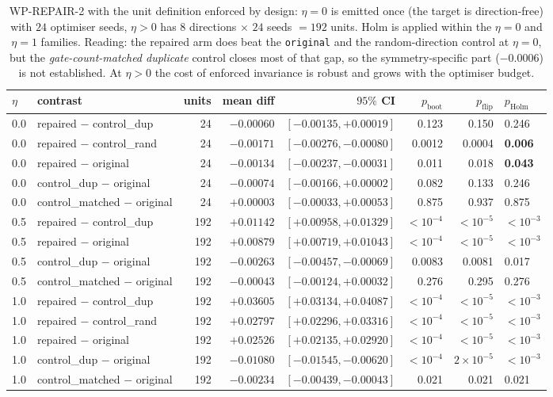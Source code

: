 \documentclass{neurips_2024}
\begin{document}
\begin{table}[t]
\centering
\caption{WP-REPAIR-2 with the unit definition enforced by design: $\eta{=}0$ is emitted
once (the target is direction-free) with $24$ optimiser seeds, $\eta{>}0$ has
$8$ directions $\times$ $24$ seeds $=192$ units. Holm is applied within the
$\eta{=}0$ and $\eta{=}1$ families. Reading: the repaired arm does beat the
\texttt{original} and the random-direction control at $\eta{=}0$, but the
\emph{gate-count-matched duplicate} control closes most of that gap, so the
symmetry-specific part ($-0.0006$) is not established. At $\eta{>}0$ the cost of enforced
invariance is robust and grows with the optimiser budget.}
\label{tab:rep2}
\small
\begin{tabular}{@{}llrrrrrl@{}}
\toprule
$\eta$ & contrast & units & mean diff & $95\%$ CI & $p_{\text{boot}}$ & $p_{\text{flip}}$ & $p_{\text{Holm}}$ \\
\midrule
0.0 & repaired $-$ control\_dup & 24 & $-0.00060$ & $[-0.00135,+0.00019]$ & 0.123 & 0.150 & 0.246 \\
0.0 & repaired $-$ control\_rand & 24 & $\mathbf{-0.00171}$ & $[-0.00276,-0.00080]$ & 0.0012 & 0.0004 & \textbf{0.006} \\
0.0 & repaired $-$ original & 24 & $\mathbf{-0.00134}$ & $[-0.00237,-0.00031]$ & 0.011 & 0.018 & \textbf{0.043} \\
0.0 & control\_dup $-$ original & 24 & $-0.00074$ & $[-0.00166,+0.00002]$ & 0.082 & 0.133 & 0.246 \\
0.0 & control\_matched $-$ original & 24 & $+0.00003$ & $[-0.00033,+0.00053]$ & 0.875 & 0.937 & 0.875 \\
\midrule
0.5 & repaired $-$ control\_dup & 192 & $+0.01142$ & $[+0.00958,+0.01329]$ & $<10^{-4}$ & $<10^{-5}$ & $<10^{-3}$ \\
0.5 & repaired $-$ original & 192 & $+0.00879$ & $[+0.00719,+0.01043]$ & $<10^{-4}$ & $<10^{-5}$ & $<10^{-3}$ \\
0.5 & control\_dup $-$ original & 192 & $-0.00263$ & $[-0.00457,-0.00069]$ & 0.0083 & 0.0081 & 0.017 \\
0.5 & control\_matched $-$ original & 192 & $-0.00043$ & $[-0.00124,+0.00032]$ & 0.276 & 0.295 & 0.276 \\
\midrule
1.0 & repaired $-$ control\_dup & 192 & $\mathbf{+0.03605}$ & $[+0.03134,+0.04087]$ & $<10^{-4}$ & $<10^{-5}$ & $<10^{-3}$ \\
1.0 & repaired $-$ control\_rand & 192 & $+0.02797$ & $[+0.02296,+0.03316]$ & $<10^{-4}$ & $<10^{-5}$ & $<10^{-3}$ \\
1.0 & repaired $-$ original & 192 & $+0.02526$ & $[+0.02135,+0.02920]$ & $<10^{-4}$ & $<10^{-5}$ & $<10^{-3}$ \\
1.0 & control\_dup $-$ original & 192 & $-0.01080$ & $[-0.01545,-0.00620]$ & $<10^{-4}$ & $2\times10^{-5}$ & $<10^{-3}$ \\
1.0 & control\_matched $-$ original & 192 & $-0.00234$ & $[-0.00439,-0.00043]$ & 0.021 & 0.021 & 0.021 \\
\bottomrule
\end{tabular}
\end{table}
\end{document}
